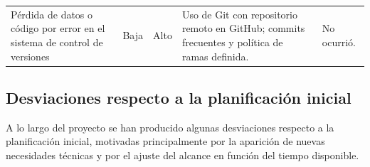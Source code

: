 \begin{longtable}{p{3.5cm}p{1.5cm}p{1.5cm}p{4.5cm}p{3.5cm}}
Pérdida de datos o código por error en el sistema de control de versiones &
Baja & Alto &
Uso de Git con repositorio remoto en GitHub; commits frecuentes y política de ramas definida. &
No ocurrió. \\

\end{longtable}

\subsection{Desviaciones respecto a la planificación inicial}\label{sec:desviaciones}

A lo largo del proyecto se han producido algunas desviaciones respecto a la planificación inicial, motivadas principalmente por la aparición de nuevas necesidades técnicas y por el ajuste del alcance en función del tiempo disponible.

